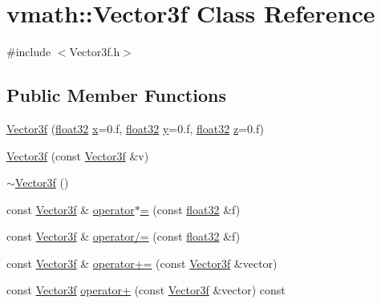 \hypertarget{classvmath_1_1Vector3f}{
\section{vmath::Vector3f Class Reference}
\label{classvmath_1_1Vector3f}
}


{\ttfamily \#include $<$Vector3f.h$>$}

\subsection*{Public Member Functions}
\begin{DoxyCompactItemize}
\item 
\hyperlink{classvmath_1_1Vector3f_a72b542084cf068d21a0d6071cdd450ac}{Vector3f} (\hyperlink{namespacecompatibility_a32a2d006ac2172c0f859370287f0104c}{float32} \hyperlink{classvmath_1_1Vector3f_adfc960779db8a0dd2f9670af4d075a4a}{x}=0.f, \hyperlink{namespacecompatibility_a32a2d006ac2172c0f859370287f0104c}{float32} \hyperlink{classvmath_1_1Vector3f_a22cb6b05462c55b6d5475d37dbc667f4}{y}=0.f, \hyperlink{namespacecompatibility_a32a2d006ac2172c0f859370287f0104c}{float32} \hyperlink{classvmath_1_1Vector3f_ae4aaae3b4db7ef3c3e30d7c66cb9aa76}{z}=0.f)
\item 
\hyperlink{classvmath_1_1Vector3f_aa06734767f55fe5af3b33cde02c907e9}{Vector3f} (const \hyperlink{classvmath_1_1Vector3f}{Vector3f} \&v)
\item 
\hyperlink{classvmath_1_1Vector3f_a02ab79854d0661b6edf0cb76ef772c74}{$\sim$Vector3f} ()
\item 
const \hyperlink{classvmath_1_1Vector3f}{Vector3f} \& \hyperlink{classvmath_1_1Vector3f_aa274a0c0289461862613b355c77c8600}{operator$\ast$=} (const \hyperlink{namespacecompatibility_a32a2d006ac2172c0f859370287f0104c}{float32} \&f)
\item 
const \hyperlink{classvmath_1_1Vector3f}{Vector3f} \& \hyperlink{classvmath_1_1Vector3f_a07065d310608d9dbf27ee1bcb9b7cb5f}{operator/=} (const \hyperlink{namespacecompatibility_a32a2d006ac2172c0f859370287f0104c}{float32} \&f)
\item 
const \hyperlink{classvmath_1_1Vector3f}{Vector3f} \& \hyperlink{classvmath_1_1Vector3f_a7e23d7c01554d891030e12bd16b8a84e}{operator+=} (const \hyperlink{classvmath_1_1Vector3f}{Vector3f} \&vector)
\item 
const \hyperlink{classvmath_1_1Vector3f}{Vector3f} \hyperlink{classvmath_1_1Vector3f_ad04924bcee5ec66d7c4de7532c963bb0}{operator+} (const \hyperlink{classvmath_1_1Vector3f}{Vector3f} \&vector) const 

\end{DoxyCompactItemize}
